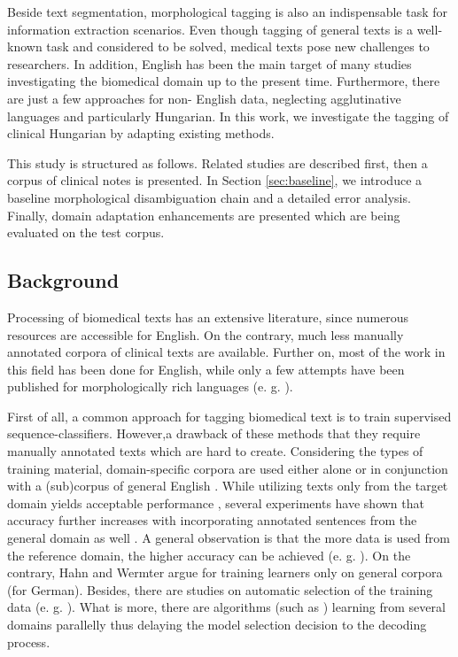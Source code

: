 Beside text segmentation, morphological tagging is also an indispensable task for information extraction scenarios. 
Even though tagging of general texts is a well-known task and considered to be solved, medical texts pose new challenges to researchers. 
In addition, English has been the main target of many studies investigating the biomedical domain up to the present time. 
Furthermore, there are just a few approaches for non- English data, neglecting agglutinative languages and particularly Hungarian.
In this work, we investigate the tagging of clinical Hungarian by adapting existing methods.%

This study is structured as follows. 
Related studies are described first, then a corpus of clinical notes is presented.
In Section \ref{sec:baseline}, we introduce a baseline morphological disambiguation chain and a detailed error analysis. 
Finally, domain adaptation enhancements are presented which are being evaluated on the test corpus.

\subsection{Background}
\label{sec:biomed_tag}

Processing of biomedical texts has an extensive literature, since numerous resources are accessible for English. %
On the contrary, much less manually annotated corpora of clinical texts are available. 
Further on, most of the work in this field has been done for English, while only a few attempts have been published for morphologically rich languages (e. g. \cite{oleynik2009performance,rost2008lessons}).

First of all, a common approach for tagging biomedical text is to train supervised sequence-classifiers. 
However,a drawback of these methods that they require manually annotated texts which are hard to create.%
Considering the types of training material, domain-specific corpora are used either alone \cite{pakhomov2006developing,Savova2010,Smith2006} or in conjunction with a (sub)corpus of general English \cite{coden2005domain,ferraro2013improving,miller2007building}.%
While utilizing texts only from the target domain yields acceptable performance \cite{pakhomov2006developing,Savova2010,Smith2006}, 
several experiments have shown that accuracy further increases with incorporating annotated sentences from the general domain as well \cite{barrett2011token,coden2005domain}. 
A general observation is that the more data is used from the reference domain, the higher accuracy can be achieved (e. g. \cite{pestian2004development}). 
On the contrary, Hahn and Wermter argue for training learners only on general corpora \cite{hahn2004tagging} (for German). 
Besides, there are studies on automatic selection of the training data (e. g. \cite{liu2007heuristic}).%
What is more, there are algorithms (such as \cite{choi2012fast}) learning from several domains parallelly thus delaying the model selection decision to the decoding process. 

